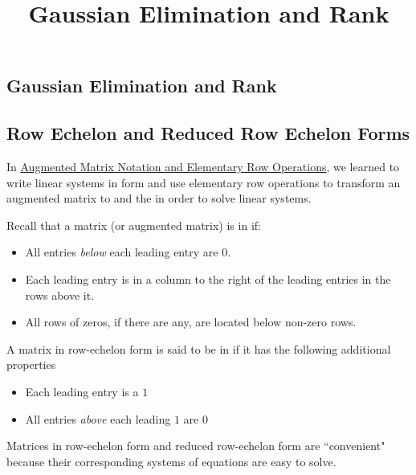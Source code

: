\documentclass{ximera}
\title{Gaussian Elimination and Rank} \license{CC BY-NC-SA 4.0}
\begin{document}
\begin{abstract}
 
\end{abstract}
\maketitle

\begin{onlineOnly}
\section*{Gaussian Elimination and Rank}
\end{onlineOnly}

\subsection*{Row Echelon and Reduced Row Echelon Forms}

In \href{https://ximera.osu.edu/linearalgebradzv3/LinearAlgebraInteractiveIntro/SYS-0020/main}{Augmented Matrix Notation and Elementary Row Operations}, we learned to write linear systems in  form and use elementary row operations to transform an augmented matrix to  and the  in order to solve linear systems.  

Recall that a matrix (or augmented matrix) is in  if:
\begin{itemize}
\item All entries {\it below} each leading entry are $0$.
\item Each leading entry is in a column to the right of the leading entries in the rows above it.
\item All rows of zeros, if there are any, are located below non-zero rows.
\end{itemize}

A matrix in row-echelon form is said to be in  if it has the following additional properties
\begin{itemize}
\item Each leading entry is a $1$
\item All entries {\it above} each leading $1$ are $0$
\end{itemize}


Matrices in row-echelon form and reduced row-echelon form are ``convenient" because their corresponding systems of equations are easy to solve.  
\end{document}

